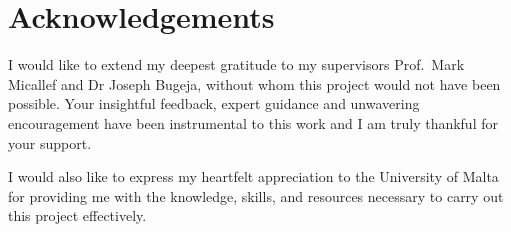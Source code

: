 \chapter*{Acknowledgements}

I would like to extend my deepest gratitude to my supervisors Prof.\ Mark
Micallef and Dr Joseph Bugeja, without whom this project would not have been
possible. Your insightful feedback, expert guidance and unwavering
encouragement have been instrumental to this work and I am truly thankful for
your support.

I would also like to express my heartfelt appreciation to the University of
Malta for providing me with the knowledge, skills, and resources necessary to carry
out this project effectively.